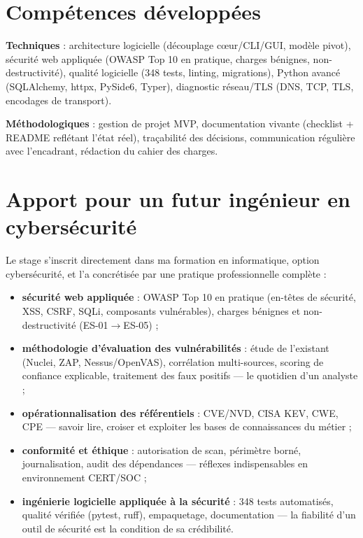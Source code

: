 \documentclass[11pt,a4paper]{report}
\begin{document}
\section{Compétences développées}

\textbf{Techniques} : architecture logicielle (découplage cœur/CLI/GUI, modèle pivot),
sécurité web appliquée (OWASP Top 10 en pratique, charges bénignes, non-destructivité),
qualité logicielle (348 tests, linting, migrations), Python avancé (SQLAlchemy, httpx,
PySide6, Typer), diagnostic réseau/TLS (DNS, TCP, TLS, encodages de transport).

\textbf{Méthodologiques} : gestion de projet MVP, documentation vivante (checklist + README
reflétant l'état réel), traçabilité des décisions, communication régulière avec
l'encadrant, rédaction du cahier des charges.

\section{Apport pour un futur ingénieur en cybersécurité}

Le stage s'inscrit directement dans ma formation en informatique, option cybersécurité,
et l'a concrétisée par une pratique professionnelle complète :

\begin{itemize}[leftmargin=1.5em]
  \item \textbf{sécurité web appliquée} : OWASP Top 10 en pratique (en-têtes de sécurité,
        XSS, CSRF, SQLi, composants vulnérables), charges bénignes et non-destructivité
        (ES-01$\rightarrow$ES-05) ;
  \item \textbf{méthodologie d'évaluation des vulnérabilités} : étude de l'existant
        (Nuclei, ZAP, Nessus/OpenVAS), corrélation multi-sources, scoring de confiance
        explicable, traitement des faux positifs --- le quotidien d'un analyste ;
  \item \textbf{opérationnalisation des référentiels} : CVE/NVD, CISA KEV, CWE, CPE ---
        savoir lire, croiser et exploiter les bases de connaissances du métier ;
  \item \textbf{conformité et éthique} : autorisation de scan, périmètre borné,
        journalisation, audit des dépendances --- réflexes indispensables en
        environnement CERT/SOC ;
  \item \textbf{ingénierie logicielle appliquée à la sécurité} : 348 tests automatisés,
        qualité vérifiée (pytest, ruff), empaquetage, documentation --- la fiabilité
        d'un outil de sécurité est la condition de sa crédibilité.
\end{itemize}
\end{document}
